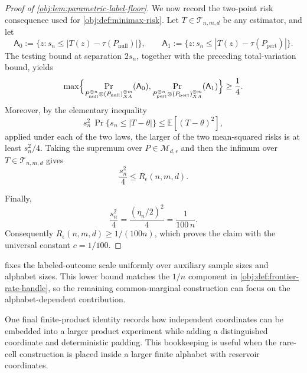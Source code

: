\documentclass[11pt]{article}
\begin{document}
\begin{proof}[Proof of \cref{obj:lem:parametric-label-floor}]
We now record the two-point risk consequence used for \cref{obj:def:minimax-risk}. Let \(T\in\mathcal T_{n,m,d}\) be any estimator, and let
\[
\mathsf A_0:=\{z:s_n\le |T(z)-\tau(P_{\mathrm{null}})|\},
\qquad
\mathsf A_1:=\{z:s_n\le |T(z)-\tau(P_{\mathrm{pert}})|\}.
\]
The testing bound at separation \(2s_n\), together with the preceding total-variation bound, yields
\[
\max\Bigl\{
\Pr_{P_{\mathrm{null}}^{\otimes n}\otimes(P_{\mathrm{null}})_{XA}^{\otimes m}}(\mathsf A_0),
\Pr_{P_{\mathrm{pert}}^{\otimes n}\otimes(P_{\mathrm{pert}})_{XA}^{\otimes m}}(\mathsf A_1)
\Bigr\}
\ge \frac14 .
\]
Moreover, by the elementary inequality
\[
s_n^2\,\Pr\{s_n\le |T-\theta|\}
\le
\mathbb E[(T-\theta)^2],
\]
applied under each of the two laws, the larger of the two mean-squared risks is at least \(s_n^2/4\). Taking the supremum over \(P\in\mathcal M_{d,\epsilon}\) and then the infimum over \(T\in\mathcal T_{n,m,d}\) gives
\[
\frac{s_n^2}{4}\le R_\epsilon(n,m,d).
\]

Finally,
\[
\frac{s_n^2}{4}
=
\frac{(\eta_n/2)^2}{4}
=
\frac{1}{100\,n}.
\]
Consequently \(R_\epsilon(n,m,d)\ge 1/(100n)\), which proves the claim with the universal constant \(c=1/100\). %
\end{proof}

 fixes the labeled-outcome scale uniformly over auxiliary sample sizes and alphabet sizes. This lower bound matches the \(1/n\) component in \cref{obj:def:frontier-rate-handle}, so the remaining common-marginal construction can focus on the alphabet-dependent contribution.

One final finite-product identity records how independent coordinates can be embedded into a larger product experiment while adding a distinguished coordinate and deterministic padding. This bookkeeping is useful when the rare-cell construction is placed inside a larger finite alphabet with reservoir coordinates.
\end{document}
